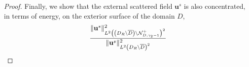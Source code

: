 \documentclass[10pt,a4paper]{amsart}
\newcommand{\bu}{\mathbf{u}}
\begin{document}
\begin{proof}
	Finally, we show that the external scattered field $\bu^s$ is also concentrated, in terms of energy, on the exterior surface of the domain $D$,
	\begin{align}
		&\frac{\|\mathbf{u}^s\|_{L^2\left(\left(D_R \setminus \overline{D}\right) \setminus \mathcal{N}_{D,\gamma_{2}-1}^{+}\right)^2}^2}{\|\mathbf{u}^s\|_{L^2\left(D_{R}\setminus \overline{D}\right)^2}^2}\notag\\

\end{align}
\end{proof}
\end{document}
